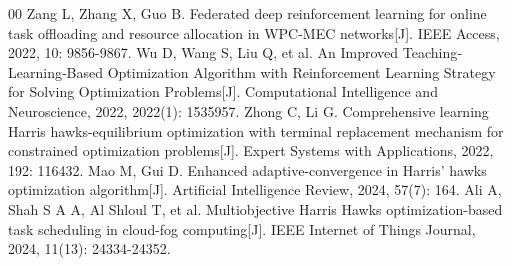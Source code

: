 \documentclass[conference]{IEEEtran}
\begin{document}
\begin{thebibliography}{00}
 Zang L, Zhang X, Guo B. Federated deep reinforcement learning for online task offloading and resource allocation in WPC-MEC networks[J]. IEEE Access, 2022, 10: 9856-9867.
 Wu D, Wang S, Liu Q, et al. An Improved Teaching‐Learning‐Based Optimization Algorithm with Reinforcement Learning Strategy for Solving Optimization Problems[J]. Computational Intelligence and Neuroscience, 2022, 2022(1): 1535957.
 Zhong C, Li G. Comprehensive learning Harris hawks-equilibrium optimization with terminal replacement mechanism for constrained optimization problems[J]. Expert Systems with Applications, 2022, 192: 116432.
 Mao M, Gui D. Enhanced adaptive-convergence in Harris’ hawks optimization algorithm[J]. Artificial Intelligence Review, 2024, 57(7): 164.
 Ali A, Shah S A A, Al Shloul T, et al. Multiobjective Harris Hawks optimization-based task scheduling in cloud-fog computing[J]. IEEE Internet of Things Journal, 2024, 11(13): 24334-24352.
\end{thebibliography}
\end{document}
